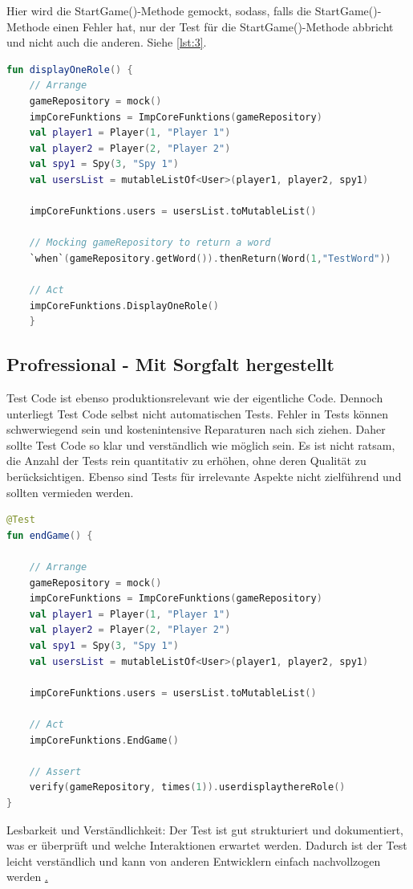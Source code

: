 Hier wird die StartGame()-Methode gemockt, sodass, falls die StartGame()-Methode einen Fehler hat, nur der Test für die StartGame()-Methode abbricht und nicht auch die anderen. Siehe \ref{lst:3}.
\begin{lstlisting}[language=Kotlin, caption={Independent}, label={lst:3}]
fun displayOneRole() {
    // Arrange
    gameRepository = mock()
    impCoreFunktions = ImpCoreFunktions(gameRepository)
    val player1 = Player(1, "Player 1")
    val player2 = Player(2, "Player 2")
    val spy1 = Spy(3, "Spy 1")
    val usersList = mutableListOf<User>(player1, player2, spy1)

    impCoreFunktions.users = usersList.toMutableList()

    // Mocking gameRepository to return a word
    `when`(gameRepository.getWord()).thenReturn(Word(1,"TestWord"))

    // Act
    impCoreFunktions.DisplayOneRole()
    }
\end{lstlisting}
\subsection*{Profressional - Mit Sorgfalt hergestellt}
Test Code ist ebenso produktionsrelevant wie der eigentliche Code. Dennoch unterliegt Test Code selbst nicht automatischen Tests. Fehler in Tests können schwerwiegend sein und kostenintensive Reparaturen nach sich ziehen. Daher sollte Test Code so klar und verständlich wie möglich sein. Es ist nicht ratsam, die Anzahl der Tests rein quantitativ zu erhöhen, ohne deren Qualität zu berücksichtigen. Ebenso sind Tests für irrelevante Aspekte nicht zielführend und sollten vermieden werden.
\begin{lstlisting}[language=Kotlin, caption={Profressional}, label={lst:4}]
@Test
fun endGame() {

    // Arrange
    gameRepository = mock()
    impCoreFunktions = ImpCoreFunktions(gameRepository)
    val player1 = Player(1, "Player 1")
    val player2 = Player(2, "Player 2")
    val spy1 = Spy(3, "Spy 1")
    val usersList = mutableListOf<User>(player1, player2, spy1)

    impCoreFunktions.users = usersList.toMutableList()

    // Act
    impCoreFunktions.EndGame()

    // Assert
    verify(gameRepository, times(1)).userdisplaythereRole()
}
\end{lstlisting}

Lesbarkeit und Verständlichkeit: Der Test ist gut strukturiert und dokumentiert, was er überprüft und welche Interaktionen erwartet werden. Dadurch ist der Test leicht verständlich und kann von anderen Entwicklern einfach nachvollzogen werden \href{lst:4}.
